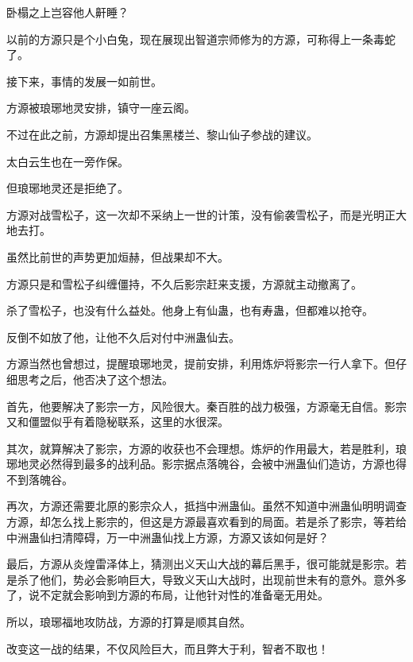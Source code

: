 \begin{this_body}
卧榻之上岂容他人鼾睡？

以前的方源只是个小白兔，现在展现出智道宗师修为的方源，可称得上一条毒蛇了。

接下来，事情的发展一如前世。

方源被琅琊地灵安排，镇守一座云阁。

不过在此之前，方源却提出召集黑楼兰、黎山仙子参战的建议。

太白云生也在一旁作保。

但琅琊地灵还是拒绝了。

方源对战雪松子，这一次却不采纳上一世的计策，没有偷袭雪松子，而是光明正大地去打。

虽然比前世的声势更加烜赫，但战果却不大。

方源只是和雪松子纠缠僵持，不久后影宗赶来支援，方源就主动撤离了。

杀了雪松子，也没有什么益处。他身上有仙蛊，也有寿蛊，但都难以抢夺。

反倒不如放了他，让他不久后对付中洲蛊仙去。

方源当然也曾想过，提醒琅琊地灵，提前安排，利用炼炉将影宗一行人拿下。但仔细思考之后，他否决了这个想法。

首先，他要解决了影宗一方，风险很大。秦百胜的战力极强，方源毫无自信。影宗又和僵盟似乎有着隐秘联系，这里的水很深。

其次，就算解决了影宗，方源的收获也不会理想。炼炉的作用最大，若是胜利，琅琊地灵必然得到最多的战利品。影宗据点落魄谷，会被中洲蛊仙们造访，方源也得不到落魄谷。

再次，方源还需要北原的影宗众人，抵挡中洲蛊仙。虽然不知道中洲蛊仙明明调查方源，却怎么找上影宗的，但这是方源最喜欢看到的局面。若是杀了影宗，等若给中洲蛊仙扫清障碍，万一中洲蛊仙找上方源，方源又该如何是好？

最后，方源从炎煌雷泽体上，猜测出义天山大战的幕后黑手，很可能就是影宗。若是杀了他们，势必会影响巨大，导致义天山大战时，出现前世未有的意外。意外多了，说不定就会影响到方源的布局，让他针对性的准备毫无用处。

所以，琅琊福地攻防战，方源的打算是顺其自然。

改变这一战的结果，不仅风险巨大，而且弊大于利，智者不取也！

\end{this_body}


